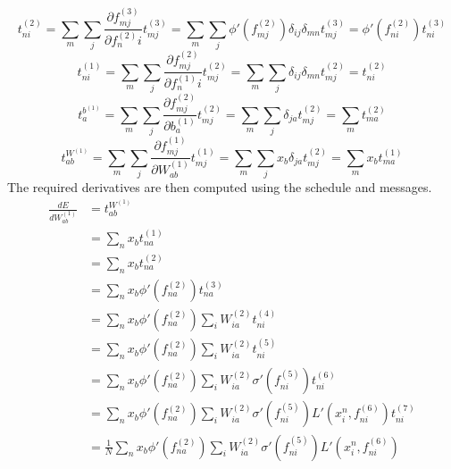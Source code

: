 \documentclass[fleqn]{report}
\begin{document}
\begin{equation}
    t^{(2)}_{ni} = \sum_m \sum_j \frac{\partial f^{(3)}_{mj}}{\partial f^{(2)}_ni} t^{(3)}_{mj} = \sum_m \sum_j \phi ' \left (f^{(2)}_{mj}\right) \delta_{ij} \delta_{mn} t^{(3)}_{mj} = \phi ' \left (f^{(2)}_{ni}\right) t^{(3)}_{ni}
\end{equation}
\begin{equation}
    t^{(1)}_{ni} = \sum_m \sum_j \frac{\partial f^{(2)}_{mj}}{\partial f^{(1)}_ni} t^{(2)}_{mj} = \sum_m \sum_j \delta_{ij} \delta_{mn} t^{(2)}_{mj} = t^{(2)}_{ni}
\end{equation}
\begin{equation}
    t^{b^{(1)}}_{a} = \sum_m \sum_j \frac{\partial f^{(2)}_{mj}}{\partial b^{(1)}_a} t^{(2)}_{mj} = \sum_m \sum_j \delta_{ja} t^{(2)}_{mj} = \sum_m t^{(2)}_{ma}
\end{equation}
\begin{equation}
    t^{W^{(1)}}_{ab} = \sum_m \sum_j \frac{\partial f^{(1)}_{mj}}{\partial W^{(1)}_{ab}} t^{(1)}_{mj} = \sum_m \sum_j x_b \delta_{ja} t^{(2)}_{mj} =
    \sum_m x_b t^{(1)}_{ma}
\end{equation}
The required derivatives are then computed using the schedule and messages.
\begin{equation}
    \begin{split}
        \frac{d E}{d W^{(1)}_{ab}} & = t^{W^{(1)}}_{ab} \\
        & = \sum_n x_b t^{(1)}_{na} \\
        & = \sum_n x_b t^{(2)}_{na} \\
        & = \sum_n x_b \phi ' \left (f^{(2)}_{na}\right) t^{(3)}_{na} \\
        & = \sum_n x_b \phi ' \left (f^{(2)}_{na}\right) \sum_i W^{(2)}_{ia} t^{(4)}_{ni} \\
        & = \sum_n x_b \phi ' \left (f^{(2)}_{na}\right) \sum_i W^{(2)}_{ia} t^{(5)}_{ni} \\
        & = \sum_n x_b \phi ' \left (f^{(2)}_{na}\right) \sum_i W^{(2)}_{ia} \sigma'\left(f^{(5)}_{ni}\right) t^{(6)}_{ni} \\
        & = \sum_n x_b \phi ' \left (f^{(2)}_{na}\right) \sum_i W^{(2)}_{ia} \sigma'\left(f^{(5)}_{ni}\right) L'\left(x^n_i, f^{(6)}_{ni}\right) t^{(7)}_{ni} \\
        & = \frac{1}{N} \sum_n x_b \phi ' \left (f^{(2)}_{na}\right) \sum_i W^{(2)}_{ia} \sigma'\left(f^{(5)}_{ni}\right) L'\left(x^n_i, f^{(6)}_{ni}\right) \\
    \end{split}
\end{equation}
\end{document}
